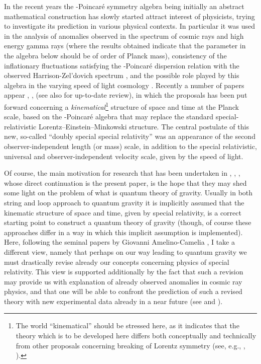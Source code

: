 \documentclass[a4paper,a4paper]{article}
\begin{document}
In the recent years the \myHighlight{$\kappa$}\coordHE{}-Poincar\'e symmetry algebra \cite{lunoruto, maru, luruto, luruza, luno} being initially an abstract mathematical construction has slowly started attract interest of physicists, trying to investigate its prediction in various physical contexts. In particular it was used in the analysis of anomalies observed in the spectrum of cosmic rays and  high energy gamma rays \cite{gacpir} (where the results obtained indicate that the parameter \myHighlight{$\kappa$}\coordHE{} in the algebra below should be of order of Planck mass), consistency of the inflationary fluctuations satisfying the \myHighlight{$\kappa$}\coordHE{}-Poincar\'e dispersion relation with the observed Harrison-Zel'dovich spectrum \cite{jkgcosm}, and the possible role played by this algebra in the varying speed of light cosmology \cite{stjo}. Recently   a number of papers appear \cite{gac1}, \cite{gac2}, \cite{jkgminl} (see also \cite{gacnew} for up-to-date review), in which the proposals has been put forward concerning a {\em kinematical}\footnote{The world ``kinematical'' should be stressed here, as it indicates that the theory which is to be developed here differs both conceptually and technically from other proposals concerning breaking of Lorentz symmetry (see, e.g., \cite{kost}, \cite{jac}).} structure of space  and time at the Planck scale, based on the \myHighlight{$\kappa$}\coordHE{}-Poincar\'e  algebra that may replace the standard special-relativistic Lorentz--Einstein--Minkowski structure. The central postulate of this new, so-called        ``doubly special special relativity'' was  an appearance of the second  observer-independent length (or mass) scale, in addition to the special relativistic, universal and observer-independent velocity scale, given by the speed of light.

Of course, the main motivation for research that has been undertaken in \cite{gac1}, \cite{gac2}, \cite{jkgminl}, whose direct continuation is the present paper, is the hope that they may shed some light on the problem of what is quantum theory of gravity. Usually in both string and loop approach to quantum gravity it is implicitly assumed that the kinematic structure of space and time, given by special relativity, is a correct starting point to construct a quantum theory of gravity (though, of course these approaches differ in a way in which this implicit assumption is implemented). Here, following the seminal papers by Giovanni Amelino-Camelia \cite{gac1}, \cite{gac2} I take a different view, namely that perhaps on our way leading to quantum gravity we must drastically revise already our concepts concerning physics of special relativity. This view is supported additionally by the fact that such a revision may provide us with explanation of already observed anomalies in cosmic ray physics,  and that one will be able to confront the prediction of such a revised theory with new experimental data already in a near future (see \cite{gacpir} and \cite{gacnew}).
\end{document}
